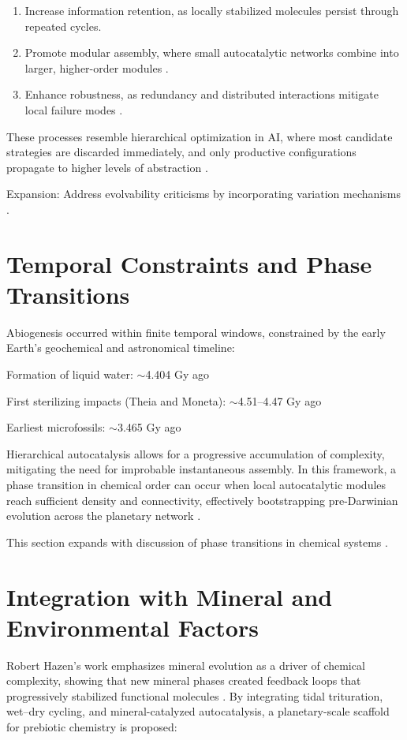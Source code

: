 \documentclass[openany]{book}
\begin{document}
\begin{enumerate}
\item Increase information retention, as locally stabilized molecules persist through repeated cycles.
\item Promote modular assembly, where small autocatalytic networks combine into larger, higher-order modules \citep{peng2022}.
\item Enhance robustness, as redundancy and distributed interactions mitigate local failure modes \citep{steel2013}.
\end{enumerate}

These processes resemble hierarchical optimization in AI, where most candidate strategies are discarded immediately, and only productive configurations propagate to higher levels of abstraction \citep{day2024}.

Expansion: Address evolvability criticisms by incorporating variation mechanisms \citep{vasas2010}.

\section{Temporal Constraints and Phase Transitions}
Abiogenesis occurred within finite temporal windows, constrained by the early Earth’s geochemical and astronomical timeline:

Formation of liquid water: $\sim$4.404 Gy ago \citep{mojzsis1996}

First sterilizing impacts (Theia and Moneta): $\sim$4.51–4.47 Gy ago

Earliest microfossils: $\sim$3.465 Gy ago \citep{rosing1999}

Hierarchical autocatalysis allows for a progressive accumulation of complexity, mitigating the need for improbable instantaneous assembly. In this framework, a phase transition in chemical order can occur when local autocatalytic modules reach sufficient density and connectivity, effectively bootstrapping pre-Darwinian evolution across the planetary network \citep{plum2025, peng2020}.

This section expands with discussion of phase transitions in chemical systems \citep{berthier2011}.

\section{Integration with Mineral and Environmental Factors}
Robert Hazen’s work emphasizes mineral evolution as a driver of chemical complexity, showing that new mineral phases created feedback loops that progressively stabilized functional molecules \citep{hazen2008}. By integrating tidal trituration, wet–dry cycling, and mineral-catalyzed autocatalysis, a planetary-scale scaffold for prebiotic chemistry is proposed:
\end{document}
